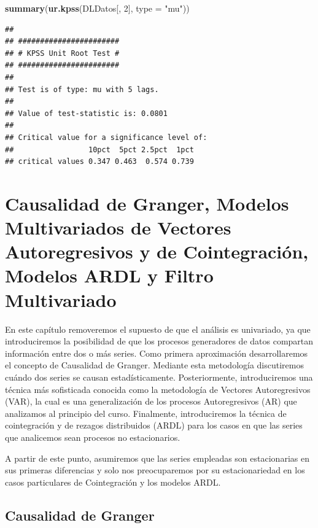 \documentclass[
]{book}
\newenvironment{Shaded}{\begin{snugshade}}{\end{snugshade}}
\newcommand{\AttributeTok}[1]{\textcolor[rgb]{0.13,0.29,0.53}{#1}}
\newcommand{\DecValTok}[1]{\textcolor[rgb]{0.00,0.00,0.81}{#1}}
\newcommand{\FunctionTok}[1]{\textcolor[rgb]{0.13,0.29,0.53}{\textbf{#1}}}
\newcommand{\NormalTok}[1]{#1}
\newcommand{\StringTok}[1]{\textcolor[rgb]{0.31,0.60,0.02}{#1}}
\begin{document}
\begin{Shaded}
\begin{Highlighting}[]
\FunctionTok{summary}\NormalTok{(}\FunctionTok{ur.kpss}\NormalTok{(DLDatos[, }\DecValTok{2}\NormalTok{], }\AttributeTok{type =} \StringTok{"mu"}\NormalTok{))}
\end{Highlighting}
\end{Shaded}

\begin{verbatim}
## 
## ####################### 
## # KPSS Unit Root Test # 
## ####################### 
## 
## Test is of type: mu with 5 lags. 
## 
## Value of test-statistic is: 0.0801 
## 
## Critical value for a significance level of: 
##                 10pct  5pct 2.5pct  1pct
## critical values 0.347 0.463  0.574 0.739
\end{verbatim}

\hypertarget{causalidad-de-granger-modelos-multivariados-de-vectores-autoregresivos-y-de-cointegraciuxf3n-modelos-ardl-y-filtro-multivariado}{%
\chapter{Causalidad de Granger, Modelos Multivariados de Vectores Autoregresivos y de Cointegración, Modelos ARDL y Filtro Multivariado}\label{causalidad-de-granger-modelos-multivariados-de-vectores-autoregresivos-y-de-cointegraciuxf3n-modelos-ardl-y-filtro-multivariado}}

En este capítulo removeremos el supuesto de que el análisis es
univariado, ya que introduciremos la posibilidad de que los procesos
generadores de datos compartan información entre dos o más series. Como
primera aproximación desarrollaremos el concepto de Causalidad de
Granger. Mediante esta metodología discutiremos cuándo dos series se
causan estadísticamente. Posteriormente, introduciremos una técnica más
sofisticada conocida como la metodología de Vectores Autoregresivos
(VAR), la cual es una generalización de los procesos Autoregresivos (AR)
que analizamos al principio del curso. Finalmente, introduciremos la
técnica de cointegración y de rezagos distribuidos (ARDL) para los casos
en que las series que analicemos sean procesos no estacionarios.

A partir de este punto, asumiremos que las series empleadas son
estacionarias en sus primeras diferencias y solo nos preocuparemos por
su estacionariedad en los casos particulares de Cointegración y los
modelos ARDL.

\hypertarget{causalidad-de-granger}{%
\section{Causalidad de Granger}\label{causalidad-de-granger}}
\end{document}
